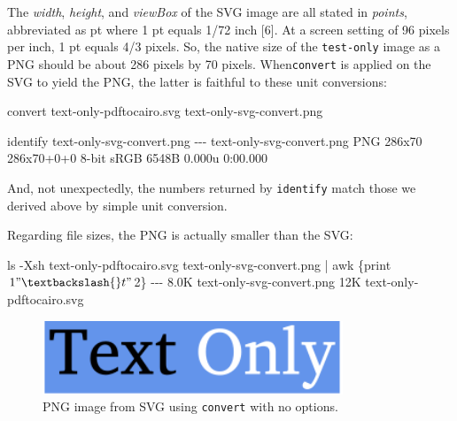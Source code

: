 \documentclass[
  11pt,
  british,
  a4paper,
]{article}
\newenvironment{Shaded}{\begin{snugshade}}{\end{snugshade}}
\newcommand{\AttributeTok}[1]{\textcolor[rgb]{0.80,0.80,0.80}{#1}}
\newcommand{\ExtensionTok}[1]{\textcolor[rgb]{0.80,0.80,0.80}{#1}}
\newcommand{\FunctionTok}[1]{\textcolor[rgb]{0.94,0.94,0.56}{#1}}
\newcommand{\KeywordTok}[1]{\textcolor[rgb]{0.94,0.87,0.69}{#1}}
\newcommand{\NormalTok}[1]{\textcolor[rgb]{0.80,0.80,0.80}{#1}}
\newcommand{\StringTok}[1]{\textcolor[rgb]{0.80,0.58,0.58}{#1}}
\begin{document}
The \emph{width}, \emph{height}, and \emph{viewBox} of the SVG image are
all stated in \emph{points}, abbreviated as pt where 1 pt equals 1/72
inch {[}6{]}. At a screen setting of 96 pixels per inch, 1 pt equals 4/3
pixels. So, the native size of the \texttt{test-only} image as a PNG
should be about 286 pixels by 70 pixels. When\texttt{convert} is applied
on the SVG to yield the PNG, the latter is faithful to these unit
conversions:

\begin{Shaded}
\begin{Highlighting}[]
\ExtensionTok{convert}\NormalTok{ text{-}only{-}pdftocairo.svg text{-}only{-}svg{-}convert.png}

\ExtensionTok{identify}\NormalTok{ text{-}only{-}svg{-}convert.png}
\ExtensionTok{{-}{-}{-}}
\ExtensionTok{text{-}only{-}svg{-}convert.png}\NormalTok{ PNG 286x70 286x70+0+0 8{-}bit sRGB 6548B 0.000u 0:00.000}
\end{Highlighting}
\end{Shaded}

And, not unexpectedly, the numbers returned by \texttt{identify} match
those we derived above by simple unit conversion.
\normalfont

Regarding file sizes, the PNG is actually smaller than the SVG:

\begin{Shaded}
\begin{Highlighting}[]
\FunctionTok{ls} \AttributeTok{{-}Xsh}\NormalTok{ text{-}only{-}pdftocairo.svg text{-}only{-}svg{-}convert.png }\KeywordTok{|} \FunctionTok{awk} \StringTok{\textquotesingle{}\{print $1 "\textbackslash{}t" $2\}\textquotesingle{}}
\ExtensionTok{{-}{-}{-}}
\ExtensionTok{8.0K}\NormalTok{    text{-}only{-}svg{-}convert.png}
\ExtensionTok{12K}\NormalTok{     text{-}only{-}pdftocairo.svg}
\end{Highlighting}
\end{Shaded}

\begin{figure}
\hypertarget{fig:convertSVGtoPNG}{%
\centering
\includegraphics[width=0.8\textwidth,height=\textheight]{images/text-only-svg-convert.png}
\caption{PNG image from SVG using \texttt{convert} with no
options.}\label{fig:convertSVGtoPNG}
}
\end{figure}
\end{document}
